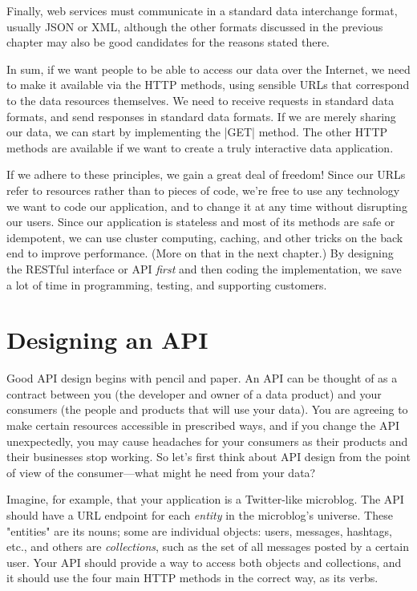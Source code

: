\documentclass[11pt]{book}
\newcommand{\term}[1]{\emph{#1}} %
\begin{document}
Finally, web services must communicate in a standard data interchange format, usually JSON or XML, although the other formats discussed in the previous chapter may also be good candidates for the reasons stated there.

In sum, if we want people to be able to access our data over the Internet, we need to make it available via the HTTP methods, using sensible URLs that correspond to the data resources themselves.  We need to receive requests in standard data formats, and send responses in standard data formats.  If we are merely sharing our data, we can start by implementing the |GET| method.  The other HTTP methods are available if we want to create a truly interactive data application.

If we adhere to these principles, we gain a great deal of freedom!  Since our URLs refer to resources rather than to pieces of code, we're free to use any technology we want to code our application, and to change it at any time without disrupting our users.  Since our application is stateless and most of its methods are safe or idempotent, we can use cluster computing, caching, and other tricks on the back end to improve performance.  (More on that in the next chapter.)  By designing the RESTful interface or API \emph{first} and then coding the implementation, we save a lot of time in programming, testing, and supporting customers.

\section{Designing an API}
Good API design begins with pencil and paper.  An API can be thought of as a contract between you (the developer and owner of a data product) and your consumers (the people and products that will use your data).  You are agreeing to make certain resources accessible in prescribed ways, and if you change the API unexpectedly, you may cause headaches for your consumers as their products and their businesses stop working.  So let's first think about API design from the point of view of the consumer---what might he need from your data?

Imagine, for example, that your application is a Twitter-like microblog.  The API should have a URL endpoint for each \term{entity} in the microblog's universe.  These "entities" are its nouns; some are individual objects: users, messages, hashtags, etc., and others are \term{collections}, such as the set of all messages posted by a certain user.  Your API should provide a way to access both objects and collections, and it should use the four main HTTP methods in the correct way, as its verbs.
\end{document}
